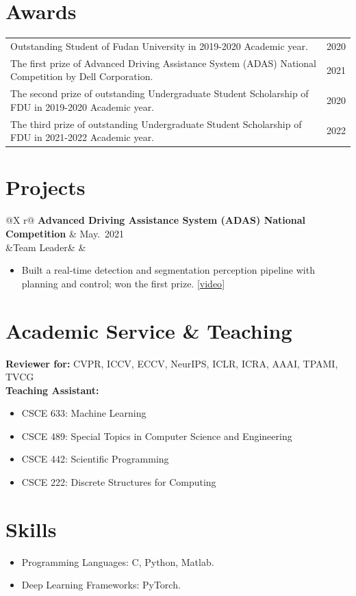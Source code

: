 \documentclass[10.5pt]{article}
\makeatletter
\newcommand{\entry}[4]{%
  \begin{tabularx}{\linewidth}{@{}X r@{}}
    \textbf{#1} & {\color{mute}#2} \\
    \ifx&#3&\else {\itshape #3} & {\itshape\color{mute}#4} \\ \fi
  \end{tabularx}\vspace{-0.4ex}}
\newcommand{\lnk}[2]{{\small[\href{#1}{#2}]}\,}
\makeatother
\begin{document}
\section{Awards}
\begin{tabularx}{\linewidth}{@{}X r@{}}
  Outstanding Student of Fudan University in 2019-2020 Academic year. & {\color{mute}2020} \\
  The first prize of Advanced Driving Assistance System (ADAS) National Competition by Dell Corporation. & {\color{mute}2021} \\
  The second prize of outstanding Undergraduate Student Scholarship of FDU in 2019-2020 Academic year. & {\color{mute}2020} \\
  The third prize of outstanding Undergraduate Student Scholarship of FDU in 2021-2022 Academic year. & {\color{mute}2022} \\
\end{tabularx}

\section{Projects}
\entry{Advanced Driving Assistance System (ADAS) National Competition}{May.\ 2021}{Team Leader}{}
\begin{itemize}
  \item Built a real-time detection and segmentation perception pipeline with planning and control; won the first prize. \lnk{https://drive.google.com/file/d/1hcRb_ya9f1QUQbqvQkiTBJ3Y9_Bq-S-k/view?usp=sharing}{video}
\end{itemize}

\section{Academic Service \& Teaching}
\textbf{Reviewer for:} CVPR, ICCV, ECCV, NeurIPS, ICLR, ICRA, AAAI, TPAMI, TVCG\\[3pt]
\textbf{Teaching Assistant:}
\begin{itemize}
  \item CSCE 633: Machine Learning
  \item CSCE 489: Special Topics in Computer Science and Engineering
  \item CSCE 442: Scientific Programming
  \item CSCE 222: Discrete Structures for Computing
\end{itemize}

\section{Skills}
\begin{itemize}
  \item Programming Languages: C, Python, Matlab.
  \item Deep Learning Frameworks: PyTorch.
\end{itemize}
\end{document}
